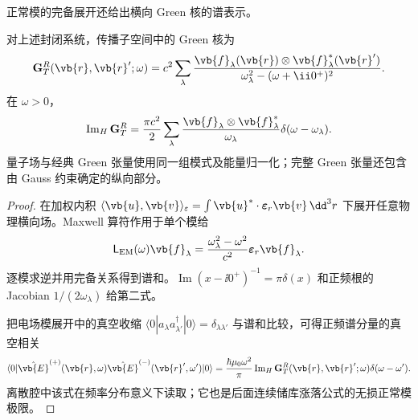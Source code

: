 正常模的完备展开还给出横向 Green 核的谱表示。
\label{sec:feqo-green-spectral}
\begin{proposition}
对上述封闭系统，传播子空间中的 Green 核为
\begin{equation}
 \mathbf G_T^R(\vb{r},\vb{r}';\omega)
 =c^2\sum_\lambda
 \frac{\vb{f}_\lambda(\vb{r})\otimes\vb{f}_\lambda^*(\vb{r}')}
 {\omega_\lambda^2-(\omega+\ii0^+)^2}.
 \label{eq:feqo-green-mode-expansion}
\end{equation}
在 $\omega>0$，
\begin{equation}
 \operatorname{Im}_{H}\mathbf G_T^R
 =\frac{\pi c^2}{2}\sum_\lambda
 \frac{\vb{f}_\lambda\otimes\vb{f}_\lambda^*}{\omega_\lambda}
 \delta(\omega-\omega_\lambda).
 \label{eq:feqo-green-mode-positive-spectrum}
\end{equation}
量子场与经典 Green 张量使用同一组模式及能量归一化；完整 Green 张量还包含由 Gauss 约束确定的纵向部分。
\end{proposition}

\begin{proof}
在加权内积 $\langle\vb{u},\vb{v}\rangle_\varepsilon=\int\vb{u}^*\cdot\boldsymbol\varepsilon_r\vb{v}\,\dd^3r$ 下展开任意物理横向场。Maxwell 算符作用于单个模给
\begin{equation*}
 \mathsf L_{\rm EM}(\omega)\vb{f}_\lambda
 =\frac{\omega_\lambda^2-\omega^2}{c^2}\boldsymbol\varepsilon_r\vb{f}_\lambda.
\end{equation*}
逐模求逆并用完备关系得到谱和。$\operatorname{Im}(x-\ii0^+)^{-1}=\pi\delta(x)$ 和正频根的 Jacobian $1/(2\omega_\lambda)$ 给第二式。

把电场模展开中的真空收缩 $\langle0|a_\lambda a_{\lambda'}^\dagger|0\rangle=\delta_{\lambda\lambda'}$ 与谱和比较，可得正频谱分量的真空相关
\begin{equation*}
 \langle0|\hat{\vb{E}}^{(+)}(\vb{r},\omega)
 \hat{\vb{E}}^{(-)}(\vb{r}',\omega')|0\rangle
 =\frac{\hbar\mu_0\omega^2}{\pi}
 \operatorname{Im}_{H}\mathbf G_T^R(\vb{r},\vb{r}';\omega)
 \delta(\omega-\omega').
\end{equation*}
离散腔中该式在频率分布意义下读取；它也是后面连续储库涨落公式的无损正常模极限。
\end{proof}

